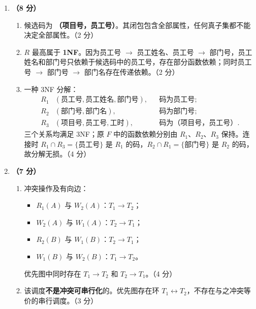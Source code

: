 \documentclass[a4paper,11pt]{article}
\begin{document}
\begin{enumerate}[start=21, label=\textbf{\arabic*.}, leftmargin=2.4em, itemsep=0.45em]
\item \textbf{（8 分）}
\begin{enumerate}[label=（\arabic*）, leftmargin=2.2em, itemsep=2pt]
  \item 候选码为 \textbf{（项目号，员工号）}。其闭包包含全部属性，任何真子集都不能决定全部属性。\hfill（2 分）
  \item $R$ 最高属于 \textbf{1NF}。因为员工号 $\to$ 员工姓名、员工号 $\to$ 部门号，员工姓名和部门号只依赖于候选码中的员工号，存在部分函数依赖；同时员工号 $\to$ 部门号 $\to$ 部门名存在传递依赖。\hfill（2 分）
  \item 一种 3NF 分解：
  \[
  \begin{aligned}
  R_1&(\text{员工号},\text{员工姓名},\text{部门号}), &&\text{码为员工号};\\
  R_2&(\text{部门号},\text{部门名}), &&\text{码为部门号};\\
  R_3&(\text{项目号},\text{员工号},\text{工时}), &&\text{码为（项目号，员工号）}.
  \end{aligned}
  \]
  三个关系均满足 3NF；原 $F$ 中的函数依赖分别由 $R_1$、$R_2$、$R_3$ 保持。连接时 $R_1\cap R_3=\{\text{员工号}\}$ 是 $R_1$ 的码，$R_2\cap R_1=\{\text{部门号}\}$ 是 $R_2$ 的码，故分解无损。\hfill（4 分）
\end{enumerate}

\item \textbf{（7 分）}
\begin{enumerate}[label=（\arabic*）, leftmargin=2.2em, itemsep=2pt]
  \item 冲突操作及有向边：
  \begin{itemize}[leftmargin=1.8em, itemsep=1pt]
    \item $R_1(A)$ 与 $W_2(A)$：$T_1\to T_2$；
    \item $W_2(A)$ 与 $W_1(A)$：$T_2\to T_1$；
    \item $R_2(B)$ 与 $W_1(B)$：$T_2\to T_1$；
    \item $W_1(B)$ 与 $W_2(B)$：$T_1\to T_2$。
  \end{itemize}
  优先图中同时存在 $T_1\to T_2$ 和 $T_2\to T_1$。\hfill（4 分）
  \item 该调度\textbf{不是冲突可串行化}的。优先图存在环 $T_1\leftrightarrow T_2$，不存在与之冲突等价的串行调度。\hfill（3 分）
\end{enumerate}

\end{enumerate}
\end{document}
